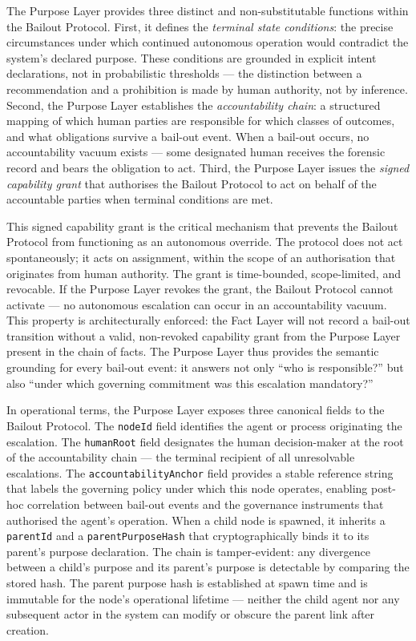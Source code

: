 The Purpose Layer provides three distinct and non-substitutable functions within the Bailout Protocol. First, it defines the \emph{terminal state conditions}: the precise circumstances under which continued autonomous operation would contradict the system's declared purpose. These conditions are grounded in explicit intent declarations, not in probabilistic thresholds — the distinction between a recommendation and a prohibition is made by human authority, not by inference. Second, the Purpose Layer establishes the \emph{accountability chain}: a structured mapping of which human parties are responsible for which classes of outcomes, and what obligations survive a bail-out event. When a bail-out occurs, no accountability vacuum exists — some designated human receives the forensic record and bears the obligation to act. Third, the Purpose Layer issues the \emph{signed capability grant} that authorises the Bailout Protocol to act on behalf of the accountable parties when terminal conditions are met.

This signed capability grant is the critical mechanism that prevents the Bailout Protocol from functioning as an autonomous override. The protocol does not act spontaneously; it acts on assignment, within the scope of an authorisation that originates from human authority. The grant is time-bounded, scope-limited, and revocable. If the Purpose Layer revokes the grant, the Bailout Protocol cannot activate — no autonomous escalation can occur in an accountability vacuum. This property is architecturally enforced: the Fact Layer will not record a bail-out transition without a valid, non-revoked capability grant from the Purpose Layer present in the chain of facts. The Purpose Layer thus provides the semantic grounding for every bail-out event: it answers not only ``who is responsible?'' but also ``under which governing commitment was this escalation mandatory?''

In operational terms, the Purpose Layer exposes three canonical fields to the Bailout Protocol. The \texttt{nodeId} field identifies the agent or process originating the escalation. The \texttt{humanRoot} field designates the human decision-maker at the root of the accountability chain — the terminal recipient of all unresolvable escalations. The \texttt{accountabilityAnchor} field provides a stable reference string that labels the governing policy under which this node operates, enabling post-hoc correlation between bail-out events and the governance instruments that authorised the agent's operation. When a child node is spawned, it inherits a \texttt{parentId} and a \texttt{parentPurposeHash} that cryptographically binds it to its parent's purpose declaration. The chain is tamper-evident: any divergence between a child's purpose and its parent's purpose is detectable by comparing the stored hash. The parent purpose hash is established at spawn time and is immutable for the node's operational lifetime — neither the child agent nor any subsequent actor in the system can modify or obscure the parent link after creation.

